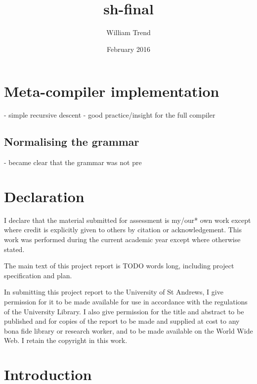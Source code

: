 \documentclass{article}
\title{sh-final}
\author{William Trend}
\date{February 2016}
\begin{document}
\maketitle

\section{Meta-compiler implementation}
- simple recursive descent
- good practice/insight for the full compiler

\subsection{Normalising the grammar}
- became clear that the grammar was not pre

\begin{abstract}

\end{abstract}

\section{Declaration}
I declare that the material submitted for assessment is my/our* own work except where credit is explicitly given to others by citation or acknowledgement. This work was performed during the current academic year except where otherwise stated.

The main text of this project report is TODO words long, including project specification and plan.

In submitting this project report to the University of St Andrews, I give permission for it to be made available for use in accordance with the regulations of the University Library. I also give permission for the title and abstract to be published and for copies of the report to be made and supplied at cost to any bona fide library or research worker, and to be made available on the World Wide Web. I retain the copyright in this work.

\section{Introduction}
\end{document}
